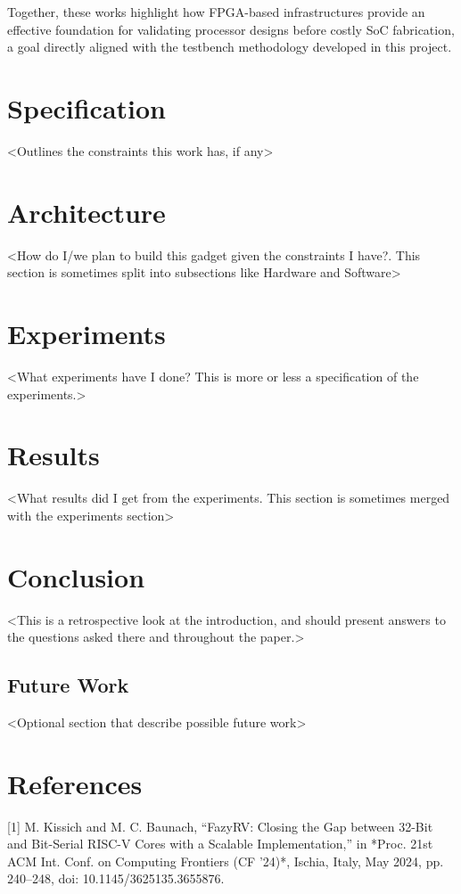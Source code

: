 \documentclass[10pt,twocolumn]{article}
\begin{document}
Together, these works highlight how FPGA-based infrastructures provide an effective foundation for validating processor designs before costly SoC fabrication, a goal directly aligned with the testbench methodology developed in this project.


\section{Specification}
<Outlines the constraints this work has, if any>\\

\section{Architecture}
<How do I/we plan to build this gadget given the constraints I have?. This section is sometimes split into subsections like Hardware and Software>

\section{Experiments}
<What experiments have I done? This is more or less a specification of the experiments.>

\section{Results}
<What results did I get from the experiments. This section is sometimes merged with the experiments section>

\section{Conclusion}
<This is a retrospective look at the introduction, and should present answers to the questions asked there and throughout the paper.>

\subsection{Future Work}
<Optional section that describe possible future work>

\section*{References}

[1] M. Kissich and M. C. Baunach, “FazyRV: Closing the Gap between 32-Bit and Bit-Serial RISC-V Cores with a Scalable Implementation,” in *Proc. 21st ACM Int. Conf. on Computing Frontiers (CF ’24)*, Ischia, Italy, May 2024, pp. 240–248, doi: 10.1145/3625135.3655876.  
\end{document}

